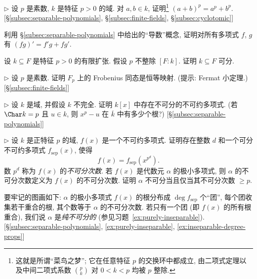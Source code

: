 \begin{prob}\label{ex:frobenius-add}
$\triangleright$ 设 $p$ 是素数, $k$ 是特征 $p>0$ 的域. 对 $a,b\in k$, 证明\footnote{这就是所谓``菜鸟之梦''; 它在任意特征 $p$ 的交换环中都成立, 由二项式定理以及中间二项式系数 $\binom{p}{k}$ 对 $0<k<p$ 均被 $p$ 整除.} $(a+b)^p=a^p+b^p$. [§\ref{subsec:separable-polynomials}, §\ref{subsec:finite-fields}, §\ref{subsec:cyclotomic}]
\end{prob}

\begin{prob}\label{ex:derivative-product}
利用 §\ref{subsec:separable-polynomials} 中给出的``导数''概念, 证明对所有多项式 $f$, $g$ 有 $(fg)'=f'g+fg'$.
\end{prob}

\begin{prob}\label{ex:char-p-not-divide-sep}
设 $k\subseteq F$ 是特征 $p>0$ 的有限扩张. 假设 $p$ 不整除 $[F:k]$. 证明 $k\subseteq F$ 可分.
\end{prob}

\begin{prob}\label{ex:frobenius-Fp-identity}
$\triangleright$ 设 $p$ 是素数. 证明 $F_p$ 上的 Frobenius 同态是恒等映射. (提示: Fermat 小定理.) [\S\ref{subsec:finite-fields}]
\end{prob}

\begin{prob}\label{ex:not-perfect-insep}
$\triangleright$ 设 $k$ 是域, 并假设 $k$ 不完全. 证明 $k[x]$ 中存在不可分的不可约多项式. (若 $\Char k=p$ 且 $u\in k$, 则 $x^p-u$ 在 $\overline{k}$ 中有多少个根?) [§\ref{subsec:separable-polynomials}]
\end{prob}

\begin{prob}\label{ex:inseparable-degree}
$\triangleright$ 设 $k$ 是正特征 $p$ 的域, $f(x)$ 是一个不可约多项式. 证明存在整数 $d$ 和一个可分不可约多项式 $f_{\mathrm{sep}}(x)$, 使得
\[
f(x)=f_{\mathrm{sep}}(x^{p^d}).
\]
数 $p^d$ 称为 $f(x)$ 的\emph{不可分次数}. 若 $f(x)$ 是代数元 $\alpha$ 的极小多项式, 则 $\alpha$ 的不可分次数定义为 $f(x)$ 的不可分次数. 证明 $\alpha$ 不可分当且仅当其不可分次数 $\geq p$.

要牢记的图画如下: $\alpha$ 的极小多项式 $f(x)$ 的根分布成 $\deg f_{\mathrm{sep}}$ 个``团'', 每个团收集若干重合的根, 其个数等于 $\alpha$ 的不可分次数. 若只有一个团 (即 $f(x)$ 的所有根重合), 我们说 $\alpha$ 是\emph{纯不可分的} (参见习题~\ref{ex:purely-inseparable}). [§\ref{subsec:separable-polynomials}, \ref{ex:purely-inseparable}, \ref{ex:inseparable-degree-props}]
\end{prob}

